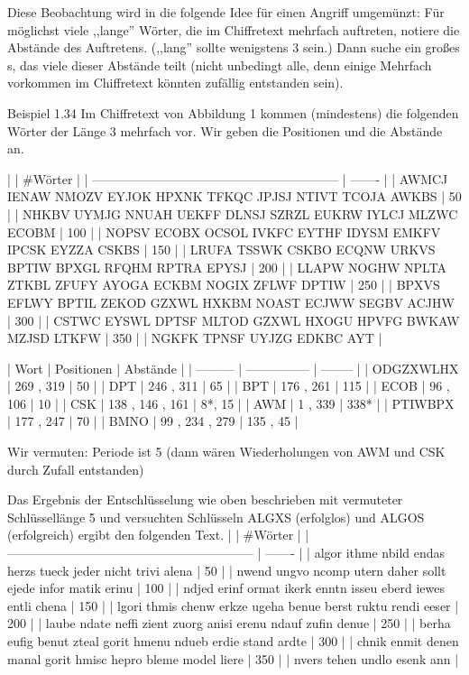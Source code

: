 \documentclass[a4paper]{article}
\begin{document}
\begin{multicols}{3}
    Diese Beobachtung wird in die folgende Idee für einen Angriff umgemünzt: Für möglichst viele ,,lange'' Wörter, die im Chiffretext mehrfach auftreten, notiere die Abstände des Auftretens. (,,lang'' sollte wenigstens 3 sein.) Dann suche ein großes s, das viele dieser Abstände teilt (nicht unbedingt alle, denn einige Mehrfach vorkommen im Chiffretext könnten zufällig entstanden sein).

    Beispiel 1.34 Im Chiffretext von Abbildung 1 kommen (mindestens) die folgenden Wörter der Länge 3  mehrfach vor. Wir geben die Positionen und die Abstände an.

    |                                                             | \#Wörter |
    | ----------------------------------------------------------- | ------- |
    | AWMCJ IENAW NMOZV EYJOK HPXNK TFKQC JPJSJ NTIVT TCOJA AWKBS | 50      |
    | NHKBV UYMJG NNUAH UEKFF DLNSJ SZRZL EUKRW IYLCJ MLZWC ECOBM | 100     |
    | NOPSV ECOBX OCSOL IVKFC EYTHF IDYSM EMKFV IPCSK EYZZA CSKBS | 150     |
    | LRUFA TSSWK CSKBO ECQNW URKVS BPTIW BPXGL RFQHM RPTRA EPYSJ | 200     |
    | LLAPW NOGHW NPLTA ZTKBL ZFUFY AYOGA ECKBM NOGIX ZFLWF DPTIW | 250     |
    | BPXVS EFLWY BPTIL ZEKOD GZXWL HXKBM NOAST ECJWW SEGBV ACJHW | 300     |
    | CSTWC EYSWL DPTSF MLTOD GZXWL HXOGU HPVFG BWKAW MZJSD LTKFW | 350     |
    | NGKFK TPNSF UYJZG EDKBC AYT                                 |

    | Wort      | Positionen      | Abstände |
    | --------- | --------------- | -------- |
    | ODGZXWLHX | 269 , 319       | 50       |
    | DPT       | 246 , 311       | 65       |
    | BPT       | 176 , 261       | 115      |
    | ECOB      | 96 , 106        | 10       |
    | CSK       | 138 , 146 , 161 | 8*, 15   |
    | AWM       | 1 , 339         | 338*     |
    | PTIWBPX   | 177 , 247       | 70       |
    | BMNO      | 99 , 234 , 279  | 135 , 45 |

    Wir vermuten: Periode ist 5 (dann wären Wiederholungen von AWM und CSK durch Zufall entstanden)

    Das Ergebnis der Entschlüsselung wie oben beschrieben mit vermuteter Schlüssellänge 5 und versuchten Schlüsseln ALGXS (erfolglos) und ALGOS (erfolgreich) ergibt den folgenden Text.
    |                                                             | \#Wörter |
    | ----------------------------------------------------------- | ------- |
    | algor ithme nbild endas herzs tueck jeder nicht trivi alena | 50      |
    | nwend ungvo ncomp utern daher sollt ejede infor matik erinu | 100     |
    | ndjed erinf ormat ikerk enntn isseu eberd iewes entli chena | 150     |
    | lgori thmis chenw erkze ugeha benue berst ruktu rendi eeser | 200     |
    | laube ndate neffi zient zuorg anisi erenu ndauf zufin denue | 250     |
    | berha eufig benut zteal gorit hmenu ndueb erdie stand ardte | 300     |
    | chnik enmit denen manal gorit hmisc hepro bleme model liere | 350     |
    | nvers tehen undlo esenk ann                                 |


\end{multicols}
\end{document}
